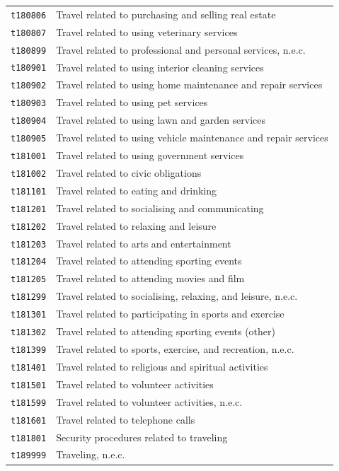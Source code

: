 \documentclass[11pt, a4paper]{article}
\begin{document}
\begin{longtable}{L{3cm} L{13cm}}
\texttt{t180806} & Travel related to purchasing and selling real estate \\
 \texttt{t180807} & Travel related to using veterinary services \\
\texttt{t180899} & Travel related to professional and personal services, n.e.c. \\
 \texttt{t180901} & Travel related to using interior cleaning services \\
\texttt{t180902} & Travel related to using home maintenance and repair services \\
 \texttt{t180903} & Travel related to using pet services \\
\texttt{t180904} & Travel related to using lawn and garden services \\
 \texttt{t180905} & Travel related to using vehicle maintenance and repair services \\
\texttt{t181001} & Travel related to using government services \\
 \texttt{t181002} & Travel related to civic obligations \\
\texttt{t181101} & Travel related to eating and drinking \\
 \texttt{t181201} & Travel related to socialising and communicating \\
\texttt{t181202} & Travel related to relaxing and leisure \\
 \texttt{t181203} & Travel related to arts and entertainment \\
\texttt{t181204} & Travel related to attending sporting events \\
 \texttt{t181205} & Travel related to attending movies and film \\
\texttt{t181299} & Travel related to socialising, relaxing, and leisure, n.e.c. \\
 \texttt{t181301} & Travel related to participating in sports and exercise \\
\texttt{t181302} & Travel related to attending sporting events (other) \\
 \texttt{t181399} & Travel related to sports, exercise, and recreation, n.e.c. \\
\texttt{t181401} & Travel related to religious and spiritual activities \\
 \texttt{t181501} & Travel related to volunteer activities \\
\texttt{t181599} & Travel related to volunteer activities, n.e.c. \\
 \texttt{t181601} & Travel related to telephone calls \\
\texttt{t181801} & Security procedures related to traveling \\
 \texttt{t189999} & Traveling, n.e.c. \\
\end{longtable}
\end{document}
